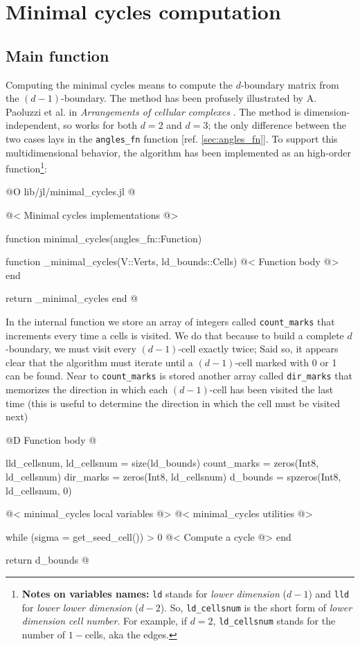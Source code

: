 \chapter{Minimal cycles computation}
\label{ch:minimal_cycles}

\section{Main function}


Computing the minimal cycles means to compute the $d$-boundary matrix
from the $(d-1)$-boundary. The method has been profusely illustrated
by A. Paoluzzi et al. in \textit{Arrangements of cellular complexes}
\cite{Paoluzzi}.
The method is dimension-independent, so works for both $d=2$ and $d=3$;
the only difference between the two cases lays in the \texttt{angles\_fn}
function [ref. \ref{sec:angles_fn}]. To support this multidimensional
behavior, the algorithm has been implemented as an high-order function\footnote{
    \textbf{Notes on variables names:} \texttt{ld} stands for \textit{lower dimension} ($d-1$)
    and \texttt{lld} for \textit{lower lower dimension} ($d-2$). So, \texttt{ld\_cellsnum} is the
    short form of \textit{lower dimension cell number}. For example, if $d=2$, \texttt{ld\_cellsnum} stands for the
    number of $1-$cells, aka the edges.
}:

@O lib/jl/minimal_cycles.jl
@{@< Minimal cycles implementations @>

function minimal_cycles(angles_fn::Function)

    function _minimal_cycles(V::Verts, ld_bounds::Cells)
        @< Function body @>
    end

    return _minimal_cycles
end
@}

In the internal function we store an array of integers called \texttt{count\_marks} 
that increments every time a cells is visited. We do that because to build 
a complete $d$-boundary, we must visit every $(d-1)$-cell exactly twice;
Said so, it appears clear that the algorithm must iterate until a $(d-1)$-cell 
marked with 0 or 1 can be found. Near to \texttt{count\_marks} is stored another
array called \texttt{dir\_marks} that memorizes the direction in which each $(d-1)$-cell
has been visited the last time (this is useful to determine the direction in which the cell
must be visited next)

@D Function body
@{lld_cellsnum, ld_cellsnum = size(ld_bounds)
count_marks = zeros(Int8, ld_cellsnum)
dir_marks = zeros(Int8, ld_cellsnum)
d_bounds = spzeros(Int8, ld_cellsnum, 0)

@< minimal\_cycles local variables @>
@< minimal\_cycles utilities @>

while (sigma = get_seed_cell()) > 0
    @< Compute a cycle @>
end

return d_bounds
@}

